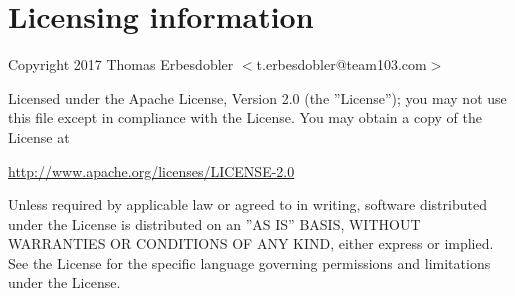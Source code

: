 \documentclass[a4paper]{article}
\begin{document}
	\section{Licensing information}
	\label{sec:licensing_information}
	
	Copyright 2017 Thomas Erbesdobler $<$t.erbesdobler@team103.com$>$
	
	Licensed under the Apache License, Version 2.0 (the ''License'');
	you may not use this file except in compliance with the License.
	You may obtain a copy of the License at
	
	\begin{center}
		\url{http://www.apache.org/licenses/LICENSE-2.0}
	\end{center}
	
	Unless required by applicable law or agreed to in writing, software
	distributed under the License is distributed on an ''AS IS'' BASIS,
	WITHOUT WARRANTIES OR CONDITIONS OF ANY KIND, either express or implied.
	See the License for the specific language governing permissions and
	limitations under the License.
	
\end{document}
